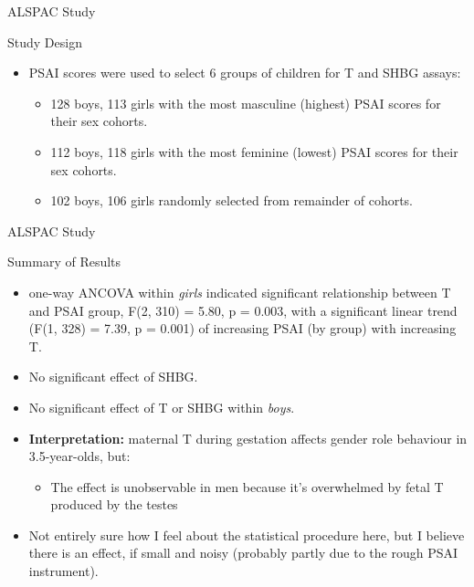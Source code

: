 \documentclass[hyperref={pdfpagelabels=false}]{beamer}
\begin{document}
\begin{frame}{ALSPAC Study \citep{hinesetal2002}}
\begin{block}{Study Design}
	\begin{itemize}
	\item PSAI scores were used to select 6 groups of children for T and SHBG assays:
		\begin{itemize}
			\item 128 boys, 113 girls with the most masculine (highest) PSAI scores for their sex cohorts.
			\item 112 boys, 118 girls with the most feminine (lowest) PSAI scores for their sex cohorts.
			\item 102 boys, 106 girls randomly selected from remainder of cohorts.
		\end{itemize}
	\end{itemize}
\end{block}
\end{frame}

\begin{frame}{ALSPAC Study \citep{hinesetal2002}}
\begin{block}{Summary of Results}
	\begin{itemize}
	\item one-way ANCOVA within \textsl{girls} indicated significant relationship between T and PSAI group, F(2, 310) = 5.80, p = 0.003, with a significant linear trend (F(1, 328) = 7.39, p = 0.001) of increasing PSAI (by group) with increasing T.
	\item No significant effect of SHBG.
	\item No significant effect of T or SHBG within \textsl{boys}.
	\item \textbf{Interpretation:} maternal T during gestation affects gender role behaviour in 3.5-year-olds, but:
		\begin{itemize}
			\item The effect is unobservable in men because it's overwhelmed by fetal T produced by the testes
		\end{itemize}
	\item Not entirely sure how I feel about the statistical procedure here, but I believe there is an effect, if small and noisy (probably partly due to the rough PSAI instrument).
	\end{itemize}
\end{block}
\end{frame}
\end{document}
